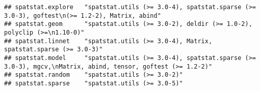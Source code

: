 \documentclass[
]{article}
\begin{document}
\begin{verbatim}
## spatstat.explore   "spatstat.utils (>= 3.0-4), spatstat.sparse (>= 3.0-3), goftest\n(>= 1.2-2), Matrix, abind"                                                                                                                                                                                                                                                                                                                                                  
## spatstat.geom      "spatstat.utils (>= 3.0-2), deldir (>= 1.0-2), polyclip (>=\n1.10-0)"                                                                                                                                                                                                                                                                                                                                                                        
## spatstat.linnet    "spatstat.utils (>= 3.0-4), Matrix, spatstat.sparse (>= 3.0-3)"                                                                                                                                                                                                                                                                                                                                                                              
## spatstat.model     "spatstat.utils (>= 3.0-4), spatstat.sparse (>= 3.0-3), mgcv,\nMatrix, abind, tensor, goftest (>= 1.2-2)"                                                                                                                                                                                                                                                                                                                                    
## spatstat.random    "spatstat.utils (>= 3.0-2)"                                                                                                                                                                                                                                                                                                                                                                                                                  
## spatstat.sparse    "spatstat.utils (>= 3.0-5)"                                                                                                                                                                                                                                                                                                                                                                                                                  

\end{verbatim}
\end{document}
